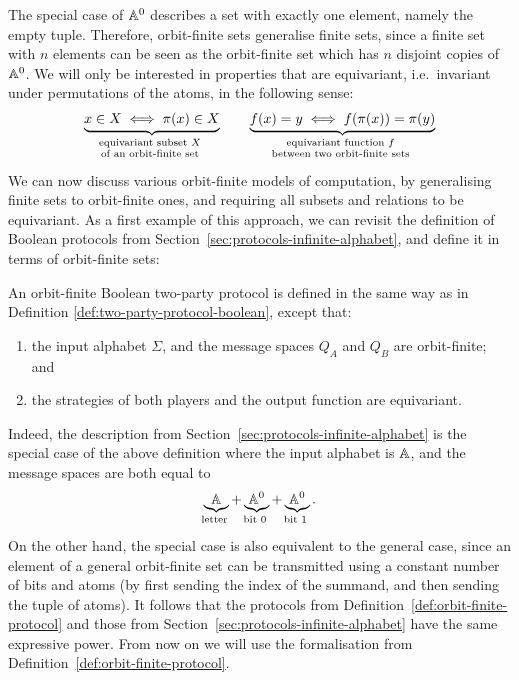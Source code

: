 The special case of $\mathbb A^0$ describes a set with exactly one element, namely the empty tuple. Therefore, orbit-finite sets generalise finite sets, since a  finite set with $n$ elements can be seen as the orbit-finite set which has $n$ disjoint copies of $\mathbb A^0$. We will only be interested in properties that are equivariant, i.e.~invariant under permutations of the atoms, in the following sense:
\begin{align*}
\myunderbrace{x \in X \iff \pi(x) \in X}{equivariant subset $X$ \\ of an orbit-finite set}
\qquad 
\myunderbrace{f(x) = y \iff f(\pi(x)) = \pi(y)}{equivariant function $f$ \\ between two orbit-finite sets}
\end{align*}
We can now discuss various orbit-finite models of computation, by generalising finite sets to orbit-finite ones, and requiring all subsets and relations to be equivariant. As a first example of this approach, we can revisit the definition of Boolean protocols from Section~\ref{sec:protocols-infinite-alphabet}, and define it in terms of orbit-finite sets:

\begin{definition}
    \label{def:orbit-finite-protocol}
  An orbit-finite Boolean two-party protocol  is defined in the same way as in Definition \ref{def:two-party-protocol-boolean}, except that:
  \begin{enumerate}
    \item the input alphabet $\Sigma$, and the message spaces $Q_A$ and $Q_B$ are orbit-finite; and 
    \item the strategies of both players and the output function are equivariant.
  \end{enumerate}
\end{definition}

Indeed, the description from Section~\ref{sec:protocols-infinite-alphabet} is  the special case of the above definition where the input alphabet is $\mathbb A$, and the message spaces are both equal to 
\begin{align*}
\myunderbrace{\atoms}{letter} + \myunderbrace{\atoms^0}{bit 0} + \myunderbrace{\atoms^0}{bit 1}.
\end{align*}
On the other hand, the special case is also equivalent to the general case, since an element of a general orbit-finite set can be
transmitted using a constant number of bits and atoms (by first sending the index of the summand, and then sending the tuple of atoms).
It follows that the protocols from Definition~\ref{def:orbit-finite-protocol} and those from Section~\ref{sec:protocols-infinite-alphabet} have the same expressive power. From now on we will use the formalisation from Definition~\ref{def:orbit-finite-protocol}.

